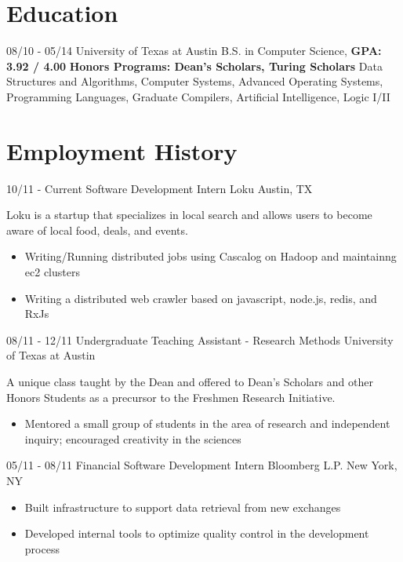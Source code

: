 \documentclass[11pt,letter,sans]{moderncv}
\begin{document}
\maketitle

\section{Education}
\cventry
{08/10 - 05/14}
{University of Texas at Austin}
{B.S. in Computer Science, \textbf{GPA: 3.92 / 4.00}}
{}
{}
{\textbf{Honors Programs: Dean's Scholars, Turing Scholars}}
{ Data Structures and Algorithms, Computer
  Systems, Advanced Operating Systems, Programming Languages, Graduate
Compilers, Artificial Intelligence, Logic I/II}


\section{Employment History}
\cventry
{10/11 - Current}
{Software Development Intern}
{Loku}
{Austin, TX}
{}
{Loku is a startup that specializes in local search and allows users to become
  aware of local food, deals, and events.
  \begin{itemize}
    \item Writing/Running distributed jobs using Cascalog on Hadoop and
      maintainng ec2 clusters
    \item Writing a distributed web crawler based on javascript, node.js, redis, and RxJs
\end{itemize}}

\cventry
{08/11 - 12/11}
{Undergraduate Teaching Assistant - Research Methods}
{University of Texas at Austin}
{}
{}
{A unique class taught by the Dean and offered to Dean's Scholars and other
  Honors Students as a precursor to the Freshmen Research Initiative.
  \begin{itemize}
    \item Mentored a small group of students in the area of research and
      independent inquiry; encouraged creativity in the sciences
\end{itemize}}

\cventry
{05/11 - 08/11}
{Financial Software Development Intern}
{Bloomberg L.P.}
{New York, NY}
{}
{
  \begin{itemize}
    \item Built infrastructure to support data retrieval from new exchanges
    \item Developed internal tools to optimize quality control in the
      development process
\end{itemize}}
\end{document}
